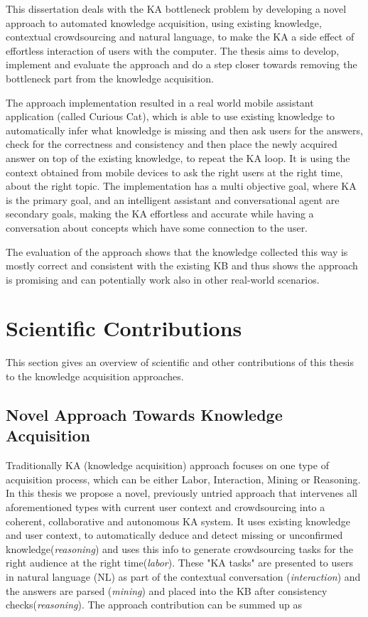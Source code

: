This dissertation deals with the KA bottleneck problem by developing a novel
approach to automated knowledge acquisition, using existing knowledge,
contextual crowdsourcing and natural language, to make the KA a side effect of
effortless interaction of users with the computer. The thesis aims to develop,
implement and evaluate the approach and do a step closer towards removing the
bottleneck part from the knowledge acquisition.

The approach implementation resulted in a real world mobile assistant 
application (called Curious Cat), which is able to use existing knowledge to 
automatically infer 
what knowledge is missing and then ask users for the answers, check for
the correctness and consistency and then place the newly acquired answer on
top of the existing knowledge, to repeat the KA loop. It is
using the context obtained from mobile devices to ask the right users at the 
right time, about the right topic. 
The implementation has a multi objective goal, 
where KA is the primary goal, and an intelligent assistant and conversational 
agent are secondary goals, making the KA effortless and accurate while having a 
conversation about concepts which have some connection to the user.

The evaluation of the approach shows that the knowledge collected this way is
mostly correct and consistent with the existing KB and thus shows the approach
is promising and can potentially work also in other real-world scenarios.

\section{Scientific Contributions}
This section gives an overview of scientific and other contributions of this 
thesis to the knowledge acquisition approaches.

\subsection{Novel Approach Towards Knowledge Acquisition}
Traditionally KA (knowledge acquisition) approach focuses on one type of 
acquisition process, which can be either Labor, Interaction, Mining or 
Reasoning\parencite{Zang2013}. In this thesis we propose a novel, previously 
untried approach that intervenes all aforementioned types with current user 
context and crowdsourcing into a coherent, collaborative and autonomous 
KA system. It uses existing knowledge and user context, to automatically 
deduce and detect missing or unconfirmed knowledge(\emph{reasoning}) and uses 
this info to generate crowdsourcing tasks for the right audience at the right 
time(\emph{labor}). These "KA tasks" are presented to users in natural language
(NL) as part of the contextual conversation (\emph{interaction}) and the 
answers are parsed (\emph{mining}) and placed into the KB after consistency 
checks(\emph{reasoning}). The approach contribution can be summed up as

